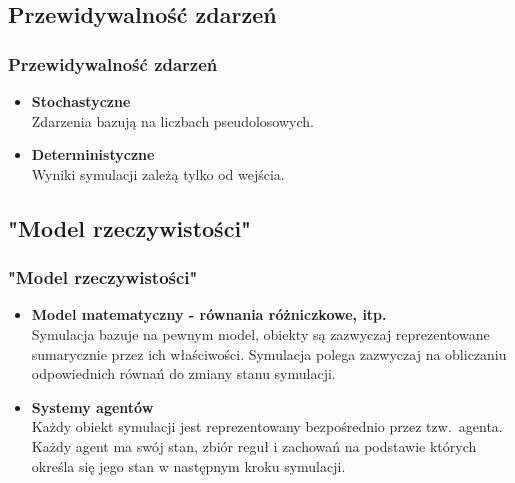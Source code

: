 \documentclass[slidestop, compress, 10pt]{beamer}
\begin{document}
    \subsection{Przewidywalność zdarzeń}
        \begin{frame}
            \frametitle{Przewidywalność zdarzeń}
            \begin{itemize}
                \item<2-> \textbf{Stochastyczne} \\
                    Zdarzenia bazują na liczbach pseudolosowych.

                \item<3-> \textbf{Deterministyczne} \\
                    Wyniki symulacji zależą tylko od wejścia.
            \end{itemize}
        \end{frame}

    \subsection{"Model rzeczywistości"}
        \begin{frame}
            \frametitle{"Model rzeczywistości"}
            \begin{itemize}
                \item<2-> \textbf{Model matematyczny - równania różniczkowe, itp.} \\
                    Symulacja bazuje na pewnym model, obiekty są zazwyczaj reprezentowane sumarycznie przez ich właściwości. Symulacja polega zazwyczaj na obliczaniu odpowiednich równań do zmiany stanu symulacji.

                \item<3-> \textbf{Systemy agentów} \\
                    Każdy obiekt symulacji jest reprezentowany bezpośrednio przez tzw.\ agenta. Każdy agent ma swój stan, zbiór reguł i zachowań na podstawie których określa się jego stan w następnym kroku symulacji.
            \end{itemize}
        \end{frame}
\end{document}
